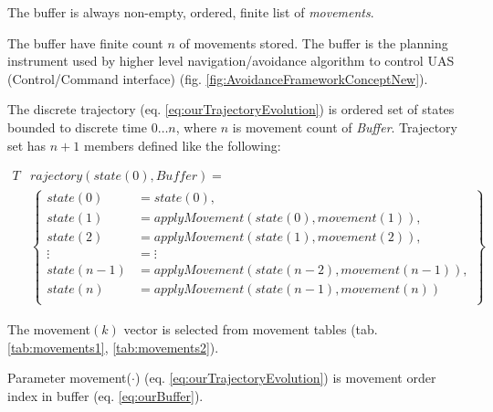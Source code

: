 \begin{assumption}
    The buffer is always non-empty, ordered, finite list of \emph{movements}.
\end{assumption}

\begin{note}
  The buffer have finite count $n$ of movements stored. The buffer is the planning instrument used by higher level navigation/avoidance algorithm to control UAS (Control/Command interface) (fig. \ref{fig:AvoidanceFrameworkConceptNew}).
\end{note}


The discrete trajectory (eq. \ref{eq:ourTrajectoryEvolution}) is ordered set of states bounded to discrete time $0\dots n$, where $n$ is movement count of \emph{Buffer}. Trajectory set has $n+1$ members defined like the following:

\begin{equation}\label{eq:ourTrajectoryEvolution}
    \begin{aligned}
    T&rajectory(state(0),Buffer)=\\
        &\left\{
        \begin{aligned}
            state(0) &= state(0),\\
            state(1) &= apply Movement\left(state(0), movement(1)\right),  \\
            state(2) &= apply Movement\left(state(1), movement(2)\right),  \\
             \vdots  &= \vdots\\
            state(n-1) &= apply Movement\left(state(n-2), movement(n-1)\right),  \\
            state(n)   &= apply Movement\left(state(n-1), movement(n)\right)  \\
        \end{aligned}
        \right\}
    \end{aligned}
\end{equation}

\noindent The movement$(k)$ vector is selected from movement tables (tab. \ref{tab:movements1}, \ref{tab:movements2}).

\begin{note}
	Parameter movement($\cdot$) (eq. \ref{eq:ourTrajectoryEvolution}) is movement order index in buffer (eq. \ref{eq:ourBuffer}).
\end{note}